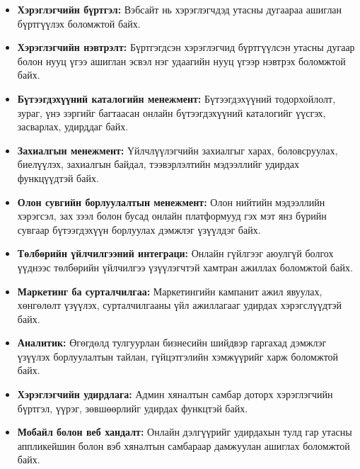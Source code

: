 \begin{itemize}
   \item \textbf{Хэрэглэгчийн бүртгэл:} Вэбсайт нь хэрэглэгчдэд утасны дугаараа ашиглан бүртгүүлэх боломжтой байх.

   \item \textbf{Хэрэглэгчийн нэвтрэлт:} Бүртгэгдсэн хэрэглэгчид бүртгүүлсэн утасны дугаар болон нууц үгээ ашиглан эсвэл нэг удаагийн нууц үгээр нэвтрэх боломжтой байх.

	\item \textbf{Бүтээгдэхүүний каталогийн менежмент:} Бүтээгдэхүүний тодорхойлолт, зураг, үнэ зэргийг багтаасан онлайн бүтээгдэхүүний каталогийг үүсгэх, засварлах, удирддаг байх.

   \item \textbf{Захиалгын менежмент:} Үйлчлүүлэгчийн захиалгыг харах, боловсруулах, биелүүлэх, захиалгын байдал, тээвэрлэлтийн мэдээллийг удирдах функцүүдтэй байх.

   \item \textbf{Олон сувгийн борлуулалтын менежмент:} Олон нийтийн мэдээллийн хэрэгсэл, зах зээл болон бусад онлайн платформууд гэх мэт янз бүрийн сувгаар бүтээгдэхүүн борлуулах дэмжлэг үзүүлдэг байх.

   \item \textbf{Төлбөрийн үйлчилгээний интеграци:} Онлайн гүйлгээг аюулгүй болгох үүднээс төлбөрийн үйлчилгээ үзүүлэгчтэй хамтран ажиллах боломжтой байх.

   \item \textbf{Маркетинг ба сурталчилгаа:} Маркетингийн кампанит ажил явуулах, хөнгөлөлт үзүүлэх, сурталчилгааны үйл ажиллагааг удирдах хэрэгслүүдтэй байх.

   \item \textbf{Аналитик:} Өгөгдөлд тулгуурлан бизнесийн шийдвэр гаргахад дэмжлэг үзүүлэх борлуулалтын тайлан, гүйцэтгэлийн хэмжүүрийг харж боломжтой байх.

   \item \textbf{Хэрэглэгчийн удирдлага:} Админ хяналтын самбар доторх хэрэглэгчийн бүртгэл, үүрэг, зөвшөөрлийг удирдах функцтэй байх.

   \item \textbf{Мобайл болон веб хандалт:} Онлайн дэлгүүрийг удирдахын тулд гар утасны аппликейшин болон вэб хяналтын самбараар дамжуулан ашиглах боломжтой байх.
\end{itemize}

